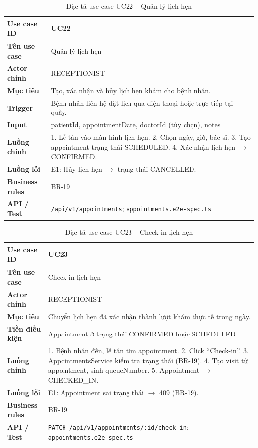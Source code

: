 \begin{table}[H]
\centering
\caption{Đặc tả use case UC22 -- Quản lý lịch hẹn}
\label{tab:uc22}
\begin{tabularx}{\textwidth}{|p{3.6cm}|X|}
\hline
\textbf{Use case ID} & UC22 \\
\hline
\textbf{Tên use case} & Quản lý lịch hẹn \\
\hline
\textbf{Actor chính} & RECEPTIONIST \\
\hline
\textbf{Mục tiêu} & Tạo, xác nhận và hủy lịch hẹn khám cho bệnh nhân. \\
\hline
\textbf{Trigger} & Bệnh nhân liên hệ đặt lịch qua điện thoại hoặc trực tiếp tại quầy. \\
\hline
\textbf{Input} & patientId, appointmentDate, doctorId (tùy chọn), notes \\
\hline
\textbf{Luồng chính} & 1. Lễ tân vào màn hình lịch hẹn. 2. Chọn ngày, giờ, bác sĩ. 3. Tạo appointment trạng thái SCHEDULED. 4. Xác nhận lịch hẹn $\rightarrow$ CONFIRMED. \\
\hline
\textbf{Luồng lỗi} & E1: Hủy lịch hẹn $\rightarrow$ trạng thái CANCELLED. \\
\hline
\textbf{Business rules} & BR-19 \\
\hline
\textbf{API / Test} & \texttt{/api/v1/appointments}; \texttt{appointments.e2e-spec.ts} \\
\hline
\end{tabularx}
\end{table}

\begin{table}[H]
\centering
\caption{Đặc tả use case UC23 -- Check-in lịch hẹn}
\label{tab:uc23}
\begin{tabularx}{\textwidth}{|p{3.6cm}|X|}
\hline
\textbf{Use case ID} & UC23 \\
\hline
\textbf{Tên use case} & Check-in lịch hẹn \\
\hline
\textbf{Actor chính} & RECEPTIONIST \\
\hline
\textbf{Mục tiêu} & Chuyển lịch hẹn đã xác nhận thành lượt khám thực tế trong ngày. \\
\hline
\textbf{Tiền điều kiện} & Appointment ở trạng thái CONFIRMED hoặc SCHEDULED. \\
\hline
\textbf{Luồng chính} & 1. Bệnh nhân đến, lễ tân tìm appointment. 2. Click ``Check-in''. 3. AppointmentsService kiểm tra trạng thái (BR-19). 4. Tạo visit từ appointment, sinh queueNumber. 5. Appointment $\rightarrow$ CHECKED\_IN. \\
\hline
\textbf{Luồng lỗi} & E1: Appointment sai trạng thái $\rightarrow$ 409 (BR-19). \\
\hline
\textbf{Business rules} & BR-19 \\
\hline
\textbf{API / Test} & \texttt{PATCH /api/v1/appointments/:id/check-in}; \texttt{appointments.e2e-spec.ts} \\
\hline
\end{tabularx}
\end{table}


